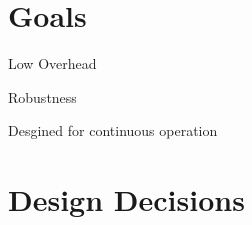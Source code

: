 \section{Goals}

\begin{compactitem}
\item Low Overhead
\item Robustness 
\item Desgined for continuous operation
\end{compactitem}


\section{Design Decisions}